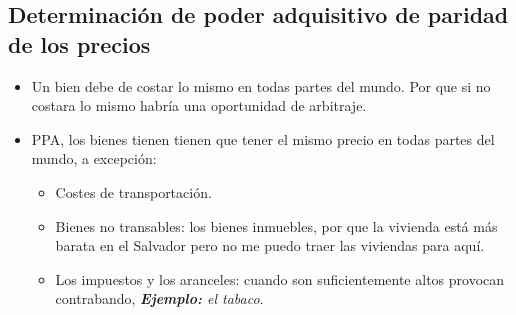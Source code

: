 \subsection{Determinación de poder adquisitivo de paridad de los precios}
\begin{itemize}
    \item Un bien debe de costar lo mismo en todas partes del mundo. Por que si no costara lo mismo habría una oportunidad de arbitraje.
    \item PPA, los bienes tienen tienen que tener el mismo precio en todas partes del mundo, a excepción:
        \begin{itemize}
            \item Costes de transportación.
            \item Bienes no transables: los bienes inmuebles, por que la vivienda está más barata en el Salvador pero no me puedo traer las viviendas para aquí.
            \item Los impuestos y los aranceles: cuando son suficientemente altos provocan contrabando, \emph{\textbf{Ejemplo: }el tabaco}.
        \end{itemize}
\end{itemize}
